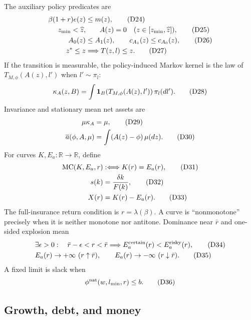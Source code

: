 \documentclass[11pt]{article}
\newcommand{\R}{\mathbb R}
\newcommand{\eqD}[1]{\refstepcounter{equation}\tag{D#1}}
\begin{document}
The auxiliary policy predicates are
\begin{align}
 \beta(1+r)e(z)&\le m(z), \eqD{24}\label{D24}\\
 z_{\min}<\widehat z,&\qquad A(z)=0\quad(z\in[z_{\min},\widehat z]), \eqD{25}\label{D25}\\
 A_0(z)&\le A_1(z),\qquad c_{A_1}(z)\le c_{A_0}(z), \eqD{26}\label{D26}\\
 z^*\le z&\Longrightarrow T(z,l)\le z. \eqD{27}\label{D27}
\end{align}
If the transition is measurable, the policy-induced Markov kernel is the law
of \(T_{M,\phi}(A(z),l')\) when \(l'\sim\pi_l\):
\begin{equation}
 \kappa_A(z,B)=\int \mathbf 1_B(T_{M,\phi}(A(z),l'))\,\pi_l(dl').
 \eqD{28}\label{D28}
\end{equation}
Invariance and stationary mean net assets are
\begin{align}
 \mu\kappa_A&=\mu, \eqD{29}\label{D29}\\
 \overline a(\phi,A,\mu)&=\int(A(z)-\phi)\,\mu(dz). \eqD{30}\label{D30}
\end{align}
For curves \(K,E_a:\R\to\R\), define
\begin{align}
 \operatorname{MC}(K,E_a,r)&:\Longleftrightarrow K(r)=E_a(r), \eqD{31}\label{D31}\\
 s(k)&=\frac{\delta k}{F(k)}, \eqD{32}\label{D32}\\
 X(r)&=K(r)-E_a(r). \eqD{33}\label{D33}
\end{align}
The full-insurance return condition is \(r=\lambda(\beta)\).  A curve is
``nonmonotone'' precisely when it is neither monotone nor antitone.  Dominance
near \(\bar r\) and one-sided explosion mean
\begin{align}
 &\exists\epsilon>0:\quad \bar r-\epsilon<r<\bar r
   \Longrightarrow E_a^{\rm certain}(r)<E_a^{\rm risky}(r), \eqD{34}\label{D34}\\
 &E_a(r)\to+\infty\ (r\uparrow\bar r),\qquad
   E_a(r)\to-\infty\ (r\downarrow\bar r). \eqD{35}\label{D35}
\end{align}
A fixed limit is slack when
\begin{equation}
 \phi^{\rm nat}(w,l_{\min},r)\le b. \eqD{36}\label{D36}
\end{equation}

\subsection{Growth, debt, and money}
\end{document}
